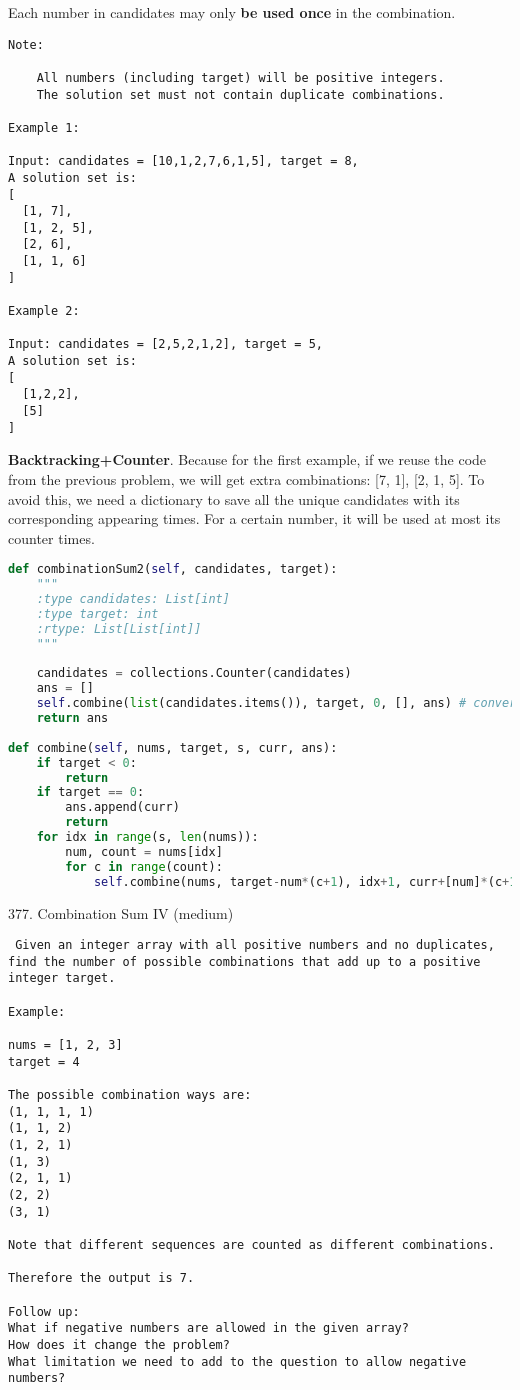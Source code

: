 \documentclass[../main.tex]{subfiles}
\begin{document}
Each number in candidates may only \textbf{be used once} in the combination.
\begin{lstlisting}
Note:

    All numbers (including target) will be positive integers.
    The solution set must not contain duplicate combinations.

Example 1:

Input: candidates = [10,1,2,7,6,1,5], target = 8,
A solution set is:
[
  [1, 7],
  [1, 2, 5],
  [2, 6],
  [1, 1, 6]
]

Example 2:

Input: candidates = [2,5,2,1,2], target = 5,
A solution set is:
[
  [1,2,2],
  [5]
]
\end{lstlisting}
\textbf{Backtracking+Counter}. Because for the first example, if we reuse the code from the previous problem, we will get extra combinations: [7, 1], [2, 1, 5]. To avoid this, we need a dictionary to save all the unique candidates with its corresponding appearing times. For a certain number, it will be used at most its counter times. 
\begin{lstlisting}[language=Python]
def combinationSum2(self, candidates, target):
    """
    :type candidates: List[int]
    :type target: int
    :rtype: List[List[int]]
    """
        
    candidates = collections.Counter(candidates)
    ans = []
    self.combine(list(candidates.items()), target, 0, [], ans) # convert the Counter to a list of (key, item) tuple
    return ans
    
def combine(self, nums, target, s, curr, ans):
    if target < 0:
        return 
    if target == 0:
        ans.append(curr)
        return
    for idx in range(s, len(nums)):           
        num, count = nums[idx]
        for c in range(count):
            self.combine(nums, target-num*(c+1), idx+1, curr+[num]*(c+1), ans )
\end{lstlisting}
377. Combination Sum IV (medium)
\begin{lstlisting}
 Given an integer array with all positive numbers and no duplicates, find the number of possible combinations that add up to a positive integer target.

Example:

nums = [1, 2, 3]
target = 4

The possible combination ways are:
(1, 1, 1, 1)
(1, 1, 2)
(1, 2, 1)
(1, 3)
(2, 1, 1)
(2, 2)
(3, 1)

Note that different sequences are counted as different combinations.

Therefore the output is 7.

Follow up:
What if negative numbers are allowed in the given array?
How does it change the problem?
What limitation we need to add to the question to allow negative numbers? 
\end{lstlisting}
\end{document}

